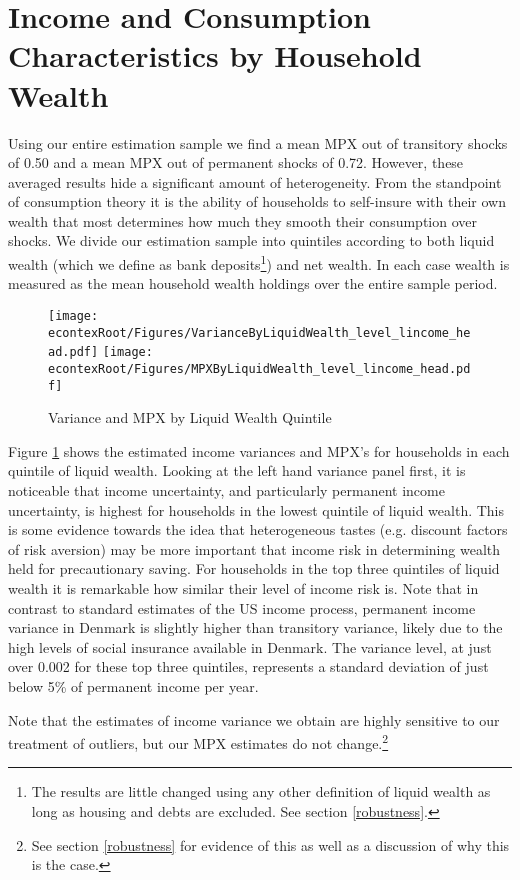 \documentclass[titlepage]{\econtex}\newcommand{\texname}{ConsumptionHeterogeneity}
\begin{document}
\section{Income and Consumption Characteristics by Household Wealth}
Using our entire estimation sample we find a mean MPX out of transitory shocks of 0.50 and a mean MPX out of permanent shocks of 0.72. However, these averaged results hide a significant amount of heterogeneity. From the standpoint of consumption theory it is the ability of households to self-insure with their own wealth that most determines how much they smooth their consumption over shocks. We divide our estimation sample into quintiles according to both liquid wealth (which we define as bank deposits\footnote{The results are little changed using any other definition of liquid wealth as long as housing and debts are excluded. See section \ref{robustness}.}) and net wealth. In each case wealth is measured as the mean household wealth holdings over the entire sample period.
\begin{figure}
	\centering
	\texttt{[image: \\econtexRoot/Figures/VarianceByLiquidWealth\_level\_lincome\_head.pdf]}
	\centering
	\texttt{[image: \\econtexRoot/Figures/MPXByLiquidWealth\_level\_lincome\_head.pdf]}
	\caption{Variance and MPX by Liquid Wealth Quintile}
	\label{fig:MPXByLiquidWealth}
\end{figure}

Figure \ref{fig:MPXByLiquidWealth} shows the estimated income variances and MPX's for households in each quintile of liquid wealth. Looking at the left hand variance panel first, it is noticeable that income uncertainty, and particularly permanent income uncertainty, is highest for households in the lowest quintile of liquid wealth. This is some evidence towards the idea that heterogeneous tastes (e.g. discount factors of risk aversion) may be more important that income risk in determining wealth held for precautionary saving. For households in the top three quintiles of liquid wealth it is remarkable how similar their level of income risk is. Note that in contrast to standard estimates of the US income process, permanent income variance in Denmark is slightly higher than transitory variance, likely due to the high levels of social insurance available in Denmark. The variance level, at just over 0.002 for these top three quintiles, represents a standard deviation of just below 5\% of permanent income per year.

Note that the estimates of income variance we obtain are highly sensitive to our treatment of outliers, but our MPX estimates do not change.\footnote{See section \ref{robustness} for evidence of this as well as a discussion of why this is the case.}
\end{document}
